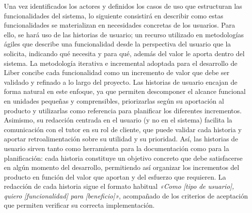 Una vez identificados los actores y definidos los casos de uso que estructuran las funcionalidades del sistema, lo siguiente consistirá en describir como estas funcionalidades se materializan en necesidades concretas de los usuarios. Para ello, se hará uso de las historias de usuario; un recurso utilizado en metodologías ágiles que describe una funcionalidad desde la perspectiva del usuario que la solicita, indicando qué necesita y para qué, además del valor le aporta dentro del sistema.
La metodología iterativa e incremental adoptada para el desarrollo de Liber \parencite{agilealliance_iterative} concibe cada funcionalidad como un incremento de valor que debe ser validado y refinado a lo largo del proyecto. Las historias de usuario encajan de forma natural en este enfoque, ya que permiten descomponer el alcance funcional en unidades pequeñas y comprensibles, priorizarlas según su aportación al producto y utilizarlas como referencia para planificar los diferentes incrementos. Asimismo, su redacción centrada en el usuario (y no en el sistema) facilita la comunicación con el tutor en su rol de cliente, que puede validar cada historia y aportar retroalimentación sobre su utilidad y su prioridad.
Así, las historias de usuario sirven tanto como herramienta para la documentación como para la planificación: cada historia constituye un objetivo concreto que debe satisfacerse en algún momento del desarrollo, permitiendo así organizar los incrementos del producto en función del valor que aportan y del esfuerzo que requieren. La redacción de cada historia sigue el formato habitual \textit{«Como [tipo de usuario], quiero [funcionalidad] para [beneficio]»}, 
acompañado de los criterios de aceptación que permiten verificar su correcta implementación.


